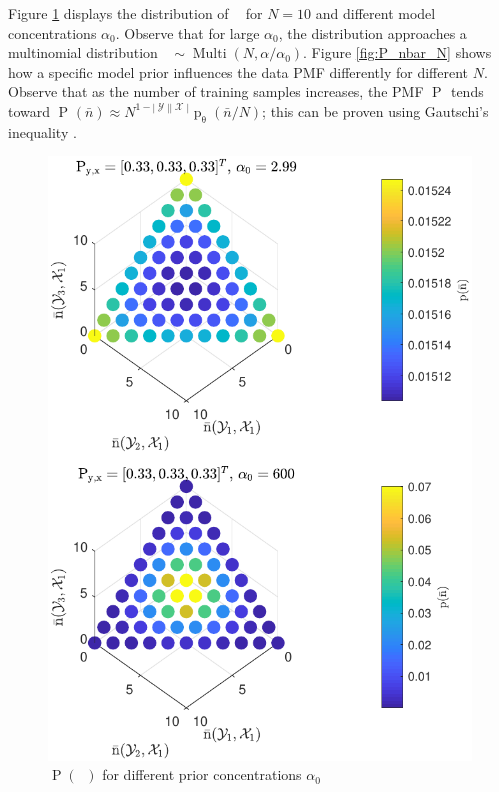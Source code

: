 \documentclass[12pt]{article}
\DeclareMathOperator{\nbarrm}{\bar{\mathrm{n}}}
\DeclareMathOperator{\Prm}{\mathrm{P}}
\DeclareMathOperator{\prm}{\mathrm{p}}
\DeclareMathOperator{\Xcal}{\mathcal{X}}
\DeclareMathOperator{\Ycal}{\mathcal{Y}}
\DeclareMathOperator{\Multi}{\mathrm{Multi}}
\begin{document}
Figure \ref{fig:P_nbar_a0} displays the distribution of $\nbarrm$ for $N=10$ and different model concentrations $\alpha_0$. Observe that for large $\alpha_0$, the distribution approaches a multinomial distribution $\nbarrm \sim \Multi(N,\alpha/\alpha_0)$. Figure \ref{fig:P_nbar_N} shows how a specific model prior influences the data PMF differently for different $N$. Observe that as the number of training samples increases, the PMF $\Prm_{\nbarrm}$ tends toward $\Prm_{\nbarrm}(\bar{n}) \approx N^{1-|\Ycal||\Xcal|}\prm_{\uptheta}(\bar{n}/N)$; this can be proven using Gautschi's inequality \cite{wendel}.
\begin{figure}
\centering
\includegraphics[width=0.7\linewidth]{P_nbar_a0.pdf}
\caption{$\Prm(\nbarrm)$ for different prior concentrations $\alpha_0$}
\label{fig:P_nbar_a0}
\end{figure}
\end{document}

